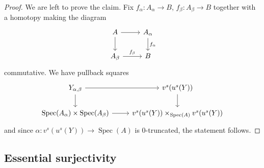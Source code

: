 \documentclass[12pt,a4paper,reqno]{amsart}
\theoremstyle{plain}
\theoremstyle{definition}
\theoremstyle{remark}
\numberwithin{equation}{section}
\begin{document}
\begin{proof}
	We are left to prove the claim. Fix $f_\alpha \colon A_\alpha \to B$, $f_\beta \colon A_\beta \to B$ together with a homotopy making the diagram
	\[ \begin{tikzcd}
	A \arrow{r} \arrow{d} & A_\alpha \arrow{d}{f_\alpha} \\
	A_\beta \arrow{r}{f_\beta} & B
	\end{tikzcd} \]
	commutative.
	We have pullback squares
	\[ \begin{tikzcd}
	Y_{\alpha, \beta} \arrow{r} \arrow{d} & v^s(u^s(Y)) \arrow{d} \\
	\operatorname{Spec}(A_\alpha) \times \operatorname{Spec}(A_\beta) \arrow{r} & v^s(u^s(Y)) \times_{\operatorname{Spec}(A)} v^s(u^s(Y))
	\end{tikzcd} \]
	and since $\alpha \colon v^s(u^s(Y)) \to \operatorname{Spec}(A)$ is $0$-truncated, the statement follows.
\end{proof}

\subsection{Essential surjectivity}
\end{document}
